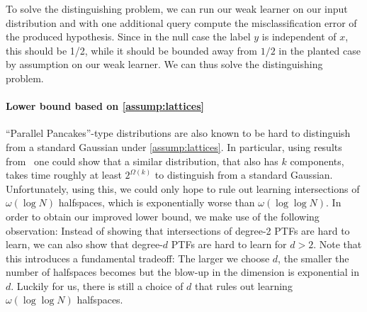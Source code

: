 \documentclass{theoretics}
\begin{document}
To solve the distinguishing problem, we can run our weak learner on our input distribution and with one additional query compute the misclassification error of the produced hypothesis.
Since in the null case the label $y$ is independent of $x$, this should be 1/2, while it should be bounded away from $1/2$ in the planted case by assumption on our weak learner.
We can thus solve the distinguishing problem.


\paragraph{Lower bound based on \cref{assump:lattices}}

``Parallel Pancakes''-type distributions are also known to be hard to distinguish from a standard Gaussian under \cref{assump:lattices}.
In particular, using results from~\cite{CLWE,CLWE_2} one could show that a similar distribution, that also has $k$ components, takes time roughly at least $2^{\Omega(k)}$ to distinguish from a standard Gaussian.
Unfortunately, using this, we could only hope to rule out learning intersections of $\omega(\log N)$ halfspaces, which is exponentially worse than $\omega(\log \log N)$.
In order to obtain our improved lower bound, we make use of the following observation:
Instead of showing that intersections of degree-2 PTFs are hard to learn, we can also show that degree-$d$ PTFs are hard to learn for $d > 2$.
Note that this introduces a fundamental tradeoff:
The larger we choose $d$, the smaller the number of halfspaces becomes but the blow-up in the dimension is exponential in $d$.
Luckily for us, there is still a choice of $d$ that rules out learning $\omega(\log \log N)$ halfspaces.
\end{document}
